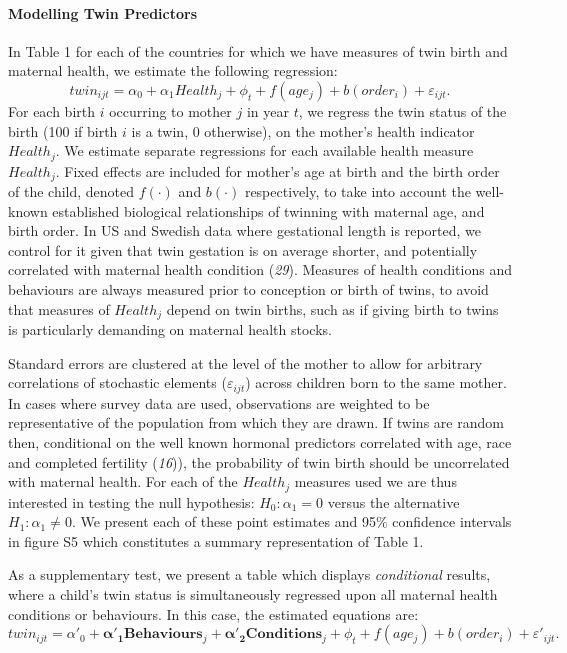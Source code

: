 \documentclass[11pt]{article}
\begin{document}
\paragraph{Modelling Twin Predictors}
In Table 1 for each of the countries for which we have measures of twin birth and maternal health, we estimate the following regression:
\begin{equation}
  twin_{ijt}=\alpha_0 + \alpha_1 Health_j + \phi_t + f(age_j) + b(order_i) + \varepsilon_{ijt}.
\end{equation}
For each birth $i$ occurring to mother $j$ in year $t$, we regress the twin status of the birth (100 if birth $i$ is a twin, 0 otherwise), on the mother's health indicator $Health_j$. We estimate separate regressions for each available health measure $Health_j$. Fixed effects are included for mother's age at birth and the birth order of the child, denoted $f(\cdot)$ and $b(\cdot)$ respectively, to take into account the well-known established biological relationships of twinning with maternal age, and birth order. In US and Swedish data where gestational length is reported, we control for it given that twin gestation is on average shorter, and potentially correlated with maternal health condition (\emph{29}).  Measures of health conditions and behaviours are always measured prior to conception or birth of twins, to avoid that measures of $Health_j$ depend on twin births, such as if giving birth to twins is particularly demanding on maternal health stocks.

Standard errors are clustered at the level of the mother to allow for arbitrary correlations of stochastic elements ($\varepsilon_{ijt}$) across children born to the same mother. In cases where survey data are used, observations are weighted to be representative of the population from which they are drawn. If twins are random then, conditional on the well known  hormonal predictors correlated with age, race and completed fertility (\emph{16})), the probability of twin birth should be uncorrelated with maternal health. For each of the $Health_j$ measures used we are thus interested in testing the null hypothesis: $H_0: \alpha_1=0$ versus the alternative $H_1: \alpha_1\neq0$.  We present each of these point estimates and 95\% confidence intervals in figure S5 which constitutes a summary representation of Table 1. 

As a supplementary test, we present a table which displays \emph{conditional} results, where a child's twin status is simultaneously regressed upon all maternal health conditions or behaviours.  In this case, the estimated equations are:
\begin{equation}
  \label{reg:twincond}
  twin_{ijt}=\alpha'_0 + \bm{\alpha'_1} \bm{Behaviours}_j + \bm{\alpha'_2} \bm{Conditions}_j + \phi_t + f(age_j) + b(order_i) + \varepsilon'_{ijt}.
\end{equation}
\end{document}
